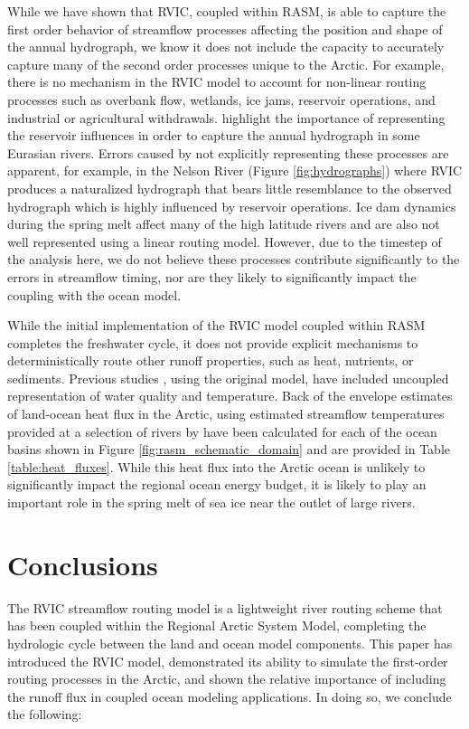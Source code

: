 \documentclass[jgrga, draft]{agutex}
\begin{document}
\begin{article}
While we have shown that RVIC, coupled within RASM, is able to capture the first order behavior of streamflow processes affecting the position and shape of the annual hydrograph, we know it does not include the capacity to accurately capture many of the second order processes unique to the Arctic.
For example, there is no mechanism in the RVIC model to account for non-linear routing processes such as overbank flow, wetlands, ice jams, reservoir operations, and industrial or agricultural withdrawals.
\citet{Adam_2007} highlight the importance of representing the reservoir influences in order to capture the annual hydrograph in some Eurasian rivers.
Errors caused by not explicitly representing these processes are apparent, for example, in the Nelson River (Figure \ref{fig:hydrographs}) where RVIC produces a naturalized hydrograph that bears little resemblance to the observed hydrograph which is highly influenced by reservoir operations.
Ice dam dynamics during the spring melt affect many of the high latitude rivers and are also not well represented using a linear routing model.
However, due to the timestep of the analysis here, we do not believe these processes contribute significantly to the errors in streamflow timing, nor are they likely to significantly impact the coupling with the ocean model.

While the initial implementation of the RVIC model coupled within RASM completes the freshwater cycle, it does not provide explicit mechanisms to deterministically route other runoff properties, such as heat, nutrients, or sediments.
Previous studies \citep[e.g.][]{vanVliet_2011,vanVliet_2012}, using the original \citet{Lohmann_1996} model, have included uncoupled representation of water quality and temperature.
Back of the envelope estimates of land-ocean heat flux in the Arctic, using estimated streamflow temperatures provided at a selection of rivers by \citet{Lammers_2007} have been calculated for each of the ocean basins shown in Figure \ref{fig:rasm_schematic_domain} and are provided in Table \ref{table:heat_fluxes}.
While this heat flux into the Arctic ocean is unlikely to significantly impact the regional ocean energy budget, it is likely to play an important role in the spring melt of sea ice near the outlet of large rivers.

\section{Conclusions}
\label{sec:conclusions}

The RVIC streamflow routing model is a lightweight river routing scheme that has been coupled within the Regional Arctic System Model, completing the hydrologic cycle between the land and ocean model components.
This paper has introduced the RVIC model, demonstrated its ability to simulate the first-order routing processes in the Arctic, and shown the relative importance of including the runoff flux in coupled ocean modeling applications.
In doing so, we conclude the following:


\end{article}
\end{document}
